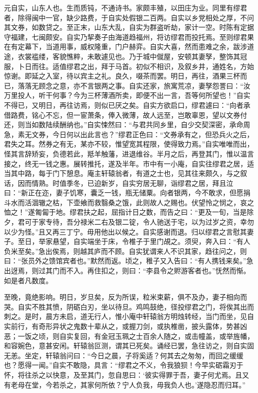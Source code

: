 \documentclass[a4paper,12pt,UTF8,twoside]{ctexbook}
\begin{document}
元自实，山东人也。生而质钝，不通诗书。家颇丰殖，以田庄为业。同里有缪君者，除得闽中一官，缺少路费，于自实处假银二百两。自实以乡党相处之厚，不问其文券，如数贷之。至正末，山东大乱，自实为群盗听劫，家计一空。时陈有定据守福建，七闽颇安。自实乃挈奏子由海道趋福州，将访缪君而投托焉。至则缪君果在有定幕下，当道用事，威权隆重，门户赫弈。自实大喜，然而患难之余，跋涉道途，衣裳褴缕，客貌憔粹，未敢遽见也。乃于城中僦屋，安顿其妻孥，整饰其冠服，卜日而往。适值缪君之出，拜于马首。初似不相识，及叙乡井，通姓名，方始惊谢。即延之入室，待以宾主之礼。良久，啜茶而罢。明日，再往，酒果三杯而已，落落无顾念之意，亦不言银两之事。自实还家，旅寓荒凉，妻孥怨詈曰：“汝万里投人，听干何事？今为三杯薄酒所卖，即便不出一言，吾等何所望也！”自实不得已，又明日，再往访焉，则似已厌之矣。自实方欲启口，缪君遽曰：“向者承借路费，铭心不忘，但一宦萧条，俸入微薄，故人远至，岂敢辜恩，望以文券付还，则当如数陆续酬纳也。”自实悚然曰：“与君共同乡里，自少交契深密，承命周急，素无文券，今日何以出此言也？”缪君正色曰：“文券承有之，但恐兵火之后，君失之耳。然券之有无，某亦不较，惟望宽其程限，使得致力焉。”自实唯唯而出，怪其言辞矫妄，负德若此，羝羊触藩，进退维谷。半月之后，再登其门，惟以温言接之，终无一钱之惠。展转推托，遂及半年。市中有一小庵，自实往缪君之居，适当其中路，每于门下憩息。庵主轩辕翁者，有道之士也，见其往来颇久，与之叙话，因而情熟。时值季冬，已迫新岁，自实穷居无聊，诣缪君之居，拜且泣曰：“新正在迩，妻子饥寒，囊乏一钱，瓶无储粟。向者银两，今不敢求，但愿捐斗水而活涸辙之枯，下壶飨而救翳桑之饿，此则故人之赐也。伏望怜之悯之，哀之恤之！”遂匍匐于地。缪君扶之起，屈指计日之数，而告之曰：“更及一旬，当是除夕，君可于家专待，吾分禄米二右及银二锭，令人驰送于宅，以为过岁之资，幸勿以少为怪。”且又再三丁宁。毋用他出以候之。自实感谢而退。归以缪君之言慰其妻子。至日，举家悬望，自实端坐于床，令椎子于里门覘之。须臾，奔入曰：“有人负米至矣。”急出俟焉，则越其庐而不顾。自实犹谓来人不识其家，趋往问之，则曰：“张员外之馈馆宾者也。”默然而返。顷之，稚子又入告曰：“有人携钱来矣。”急出迓焉，则过其门而不入。再住扣之，则曰：“李县令之赆游客者也。”怃然而惭。如是者凡数度。

至晚，竟绝影响。明日，岁旦矣，反为所误，粒米束薪，俱不及办，妻子相向而哭。自实不胜其愤，阴砺白刃，坐以待旦。鸡鸣鼓绝，径投缪君之门，将俟其出而刺之。是时，晨方未启，道无行人，惟小庵中轩辕翁方明烛转经，当门而坐，见自实前行，有奇形异状之鬼数十辈从之，或握刀剑，或执椎凿，披头露体，势甚凶恶；一饭之顷，则自实复回，有金冠玉珮之士百余人随之，或击幢盖，或举旌幡，和容婉色，意甚安闲。轩辕翁叵测，谓其已死矣。诵经已罢，急往访之，则自实固无恙。坐定，轩辕翁问曰：“今日之晨，子将奚适？何其去之匆匆，而回之缓缓也？愿得一闻。”自实不敢隐，具言：“缪君之不义，令我狼狈！今早实砺霜刃于怀，将往杀之以快意，及至其门，忽自思曰：‘彼实得罪于吾，妻子何尤焉。且又有老母在堂，今若杀之，其家何所依？宁人负我，毋我负人也。’遂隐忍而归耳。”
\end{document}
